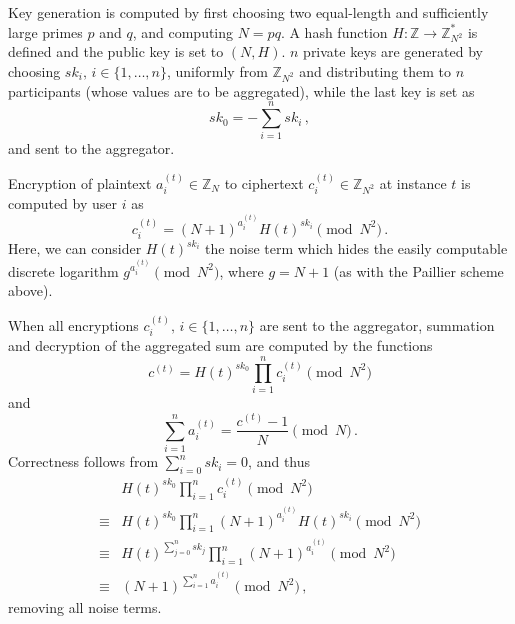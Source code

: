 Key generation is computed by first choosing two equal-length and sufficiently large primes $p$ and $q$, and computing $N=pq$. A hash function $H:\mathbb{Z} \rightarrow \mathbb{Z}_{N^2}^*$ is defined and the public key is set to $(N, H)$. $n$ private keys are generated by choosing $sk_i,\,i\in\{1,\dots,n\}$, uniformly from $\mathbb{Z}_{N^2}$ and distributing them to $n$ participants (whose values are to be aggregated), while the last key is set as
\begin{equation}
    sk_0 = -\sum^{n}_{i=1}sk_i\,,
\end{equation}
and sent to the aggregator.

Encryption of plaintext $a^{(t)}_{i} \in \mathbb{Z}_N$ to ciphertext $c^{(t)}_{i} \in \mathbb{Z}_{N^2}$ at instance $t$ is computed by user $i$ as
\begin{equation}
    c^{(t)}_{i} = (N+1)^{a^{(t)}_{i}} H(t)^{sk_i} \pmod{N^2}\,.
\end{equation}
Here, we can consider $H(t)^{sk_i}$ the noise term which hides the easily computable discrete logarithm $g^{a^{(t)}_{i}} \pmod{N^2}$, where $g=N+1$ (as with the Paillier scheme above).

When all encryptions $c^{(t)}_{i},\,i\in\{1,\dots,n\}$ are sent to the aggregator, summation and decryption of the aggregated sum are computed by the functions
\begin{equation}
    c^{(t)} = H(t)^{sk_0}\prod^{n}_{i=1}c^{(t)}_{i} \pmod{N^2} \label{eqn:agg_summation}
\end{equation}
and
\begin{equation}
    \sum^{n}_{i=1}a^{(t)}_{i} = \frac{c^{(t)}-1}{N} \pmod{N}\,. \label{eqn:agg_decryption}
\end{equation}
Correctness follows from $\sum^{n}_{i=0}sk_i = 0$, and thus
\begin{equation*}
    \begin{split}
        &H(t)^{sk_0}\prod^{n}_{i=1}c^{(t)}_{i} \pmod{N^2} \\
        \equiv &H(t)^{sk_0}\prod^{n}_{i=1}(N+1)^{a^{(t)}_{i}} H(t)^{sk_i} \pmod{N^2} \\
        \equiv &H(t)^{\sum^n_{j=0}sk_j} \prod^{n}_{i=1}(N+1)^{a^{(t)}_{i}} \pmod{N^2} \\
        \equiv &(N+1)^{\sum^n_{i=1}a^{(t)}_{i}} \pmod{N^2}\,,
    \end{split}
\end{equation*}
removing all noise terms.

% 
% 

